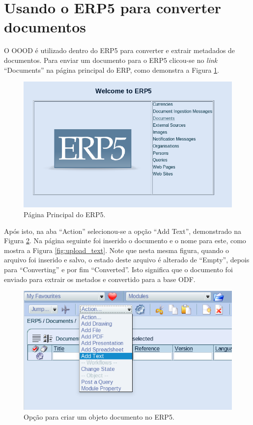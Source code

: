 \section{Usando o ERP5 para converter documentos}

O OOOD é utilizado dentro do ERP5 para converter e extrair metadados de documentos. Para enviar um documento para o ERP5 clicou-se no \textit{link} ``Documents'' na página principal do ERP, como demonstra a Figura \ref{fig:erp5_click_documents}.

\begin{figure}[!ht]
\centering
\begin{center}
\includegraphics[scale=0.400,bb=0 40 600 310]{erp5_click_documents.png}
\end{center}
\caption{Página Principal do ERP5.}
\label{fig:erp5_click_documents}
\end{figure}

Após isto, na aba ``Action'' selecionou-se a opção ``Add Text'', demonstrado na Figura \ref{fig:add_text}. Na página seguinte foi inserido o documento e o nome para este, como mostra a Figura \ref{fig:upload_text}. Note que nesta mesma figura, quando o arquivo foi inserido e salvo, o estado deste arquivo é alterado de ``Empty'', depois para ``Converting'' e por fim ``Converted''. Isto significa que o documento foi enviado para extrair os metados e convertido para a base ODF.

\begin{figure}[!ht]
\centering
\begin{center}
\includegraphics[scale=0.570,bb=0 30 510 240]{add_text.png}
\end{center}
\caption{Opção para criar um objeto documento no ERP5.}
\label{fig:add_text}
\end{figure}

